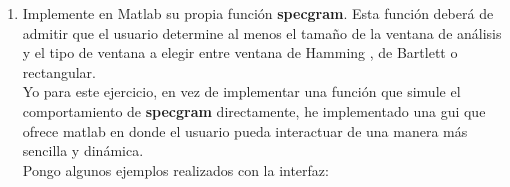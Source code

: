 \documentclass[a4paper,12pt]{article}
\begin{document}
\begin{enumerate}
\item Implemente en Matlab su propia función \textbf{specgram}. Esta función deberá de admitir que el usuario determine al menos el tamaño de la ventana de análisis y el tipo de ventana a elegir entre ventana de Hamming , de Bartlett o rectangular. \\

Yo para este ejercicio, en vez de implementar una función que simule el comportamiento de \textbf{specgram} directamente, he implementado una gui que ofrece matlab en donde el usuario pueda interactuar de una manera más sencilla y dinámica. \\

Pongo algunos ejemplos realizados con la interfaz:\\
\\
\\

\end{enumerate}
\end{document}
